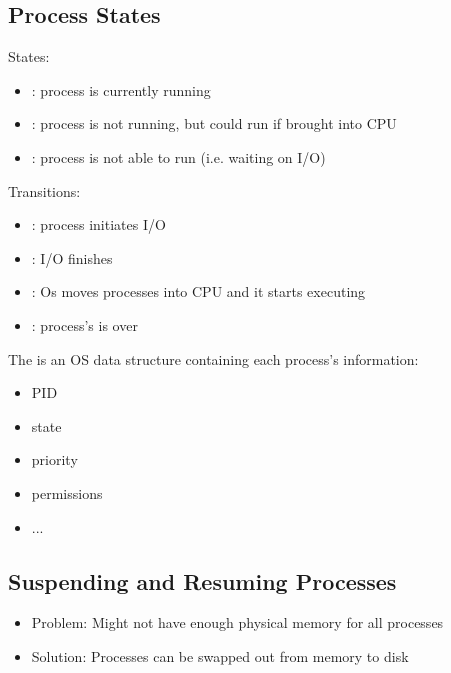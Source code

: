 \documentclass{article}
\begin{document}
\subsection{Process States}

States:
\begin{itemize}
	\item {}: process is currently running
	\item {}: process is not running, but could run if brought into CPU
	\item {}: process is not able to run (i.e. waiting on I/O)
\end{itemize}

Transitions:
\begin{itemize}
	\item {}: process initiates I/O
	\item {}: I/O finishes
	\item {}: Os moves processes into CPU and it starts executing
	\item {}: process's  is over
\end{itemize}

\begin{definition}
	The  is an OS data structure containing each process's information:
	\begin{itemize}
		\item PID
		\item state
		\item priority
		\item permissions
		\item ...
	\end{itemize}
\end{definition}

\subsection{Suspending and Resuming Processes}

\begin{itemize}
	\item Problem: Might not have enough physical memory for all processes
	\item Solution: Processes can be swapped out from memory to disk
\end{itemize}
\end{document}
